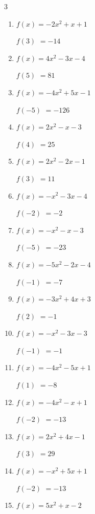 \begin{multicols}{3}
\begin{enumerate}
$f(4)$
        $= 0$

\columnbreak %

  \item $f(x)=-2x^{2}+x+1$

$f(3)$
        $= -14$

  \item $f(x)=4x^{2}-3x-4$

$f(5)$
        $= 81$

  \item $f(x)=-4x^{2}+5x-1$

$f(-5)$
        $= -126$

  \item $f(x)=2x^{2}-x-3$

$f(4)$
        $= 25$

  \item $f(x)=2x^{2}-2x-1$

$f(3)$
        $= 11$

  \item $f(x)=-x^{2}-3x-4$

$f(-2)$
        $= -2$

  \item $f(x)=-x^{2}-x-3$

$f(-5)$
        $= -23$

  \item $f(x)=-5x^{2}-2x-4$

$f(-1)$
        $= -7$

  \item $f(x)=-3x^{2}+4x+3$

$f(2)$
        $= -1$

  \item $f(x)=-x^{2}-3x-3$

$f(-1)$
        $= -1$

  \item $f(x)=-4x^{2}-5x+1$

$f(1)$
        $= -8$

  \item $f(x)=-4x^{2}-x+1$

$f(-2)$
        $= -13$

  \item $f(x)=2x^{2}+4x-1$

$f(3)$
        $= 29$

  \item $f(x)=-x^{2}+5x+1$

$f(-2)$
        $= -13$

  \item $f(x)=5x^{2}+x-2$


\end{enumerate}
\end{multicols}

